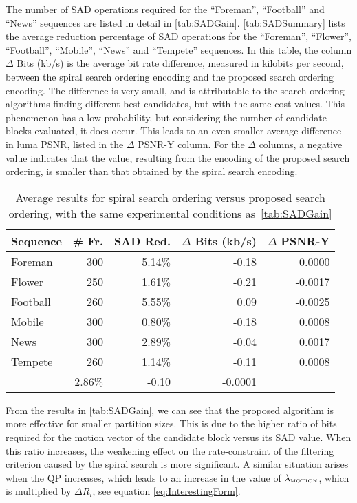 \documentclass{article}
\newcommand{\LM}{\lambda_{\text{\tiny{MOTION}}}}
\begin{document}
The number of SAD operations required for the ``Foreman'', ``Football''
and ``News'' sequences are listed in detail in \autoref{tab:SADGain}.
\autoref{tab:SADSummary} lists the average reduction percentage of SAD
operations for the ``Foreman'', ``Flower'', ``Football'', ``Mobile'', ``News'' and
``Tempete'' sequences. In this table, the column $\Delta$ Bits (kb/s) is the average bit
rate difference, measured in kilobits per second, between the spiral search
ordering encoding and the proposed search ordering encoding. The difference is
very small, and is attributable to the search ordering algorithms finding different
best candidates, but with the same cost values. This phenomenon has a low
probability, but considering the number of candidate blocks evaluated, it does
occur. This leads to an even smaller average difference in luma PSNR, listed in the $\Delta$
PSNR-Y column. For the $\Delta$ columns, a negative value indicates that the value,
resulting from the encoding of the proposed search ordering, is smaller than that
obtained by the spiral search encoding.
\begin{table}[htb]
	\vspace{-0.5em}
  \caption{Average results for spiral search ordering versus proposed
  search ordering, with the same experimental conditions
  as~\autoref{tab:SADGain}}
  \label{tab:SADSummary}
  \centering
  \small{
  \begin{tabular}{|l*{4}{|r}|}  \hline
Sequence &\# Fr. &SAD Red. & $\Delta$ Bits (kb/s) & $\Delta$ PSNR-Y \\  \hline
Foreman &300 &5.14\% & -0.18 & 0.0000 \\  \hline
Flower &250 &1.61\% & -0.21 & -0.0017 \\  \hline
Football &260 &5.55\% & 0.09 & -0.0025 \\  \hline
Mobile &300 &0.80\% & -0.18 & 0.0008 \\  \hline
News &300 &2.89\% & -0.04 & 0.0017 \\  \hline
Tempete &260 &1.14\% & -0.11 & 0.0008 \\  \hhline{|=|=|=|=|=|}
&2.86\% & -0.10 & -0.0001 \\ \hline 
  \end{tabular}}
\vspace{-0.5em}
\end{table}

From the results in \autoref{tab:SADGain}, we can see that the proposed
algorithm is more effective for smaller partition sizes. This is due to the
higher ratio of bits required for the motion vector of the candidate block
versus its SAD value. When this ratio increases, the weakening effect on the
rate-constraint of the filtering criterion caused by the spiral search is more
significant. A similar situation arises when the QP increases, which leads to an
increase in the value of $\LM$, which is multiplied by $\Delta R_i$, see
equation \eqref{eq:InterestingForm}.
\end{document}
